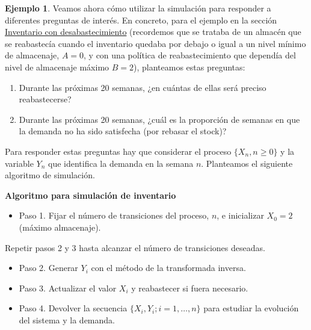 \documentclass[
]{book}
\providecommand{\tightlist}{%
  \setlength{\itemsep}{0pt}\setlength{\parskip}{0pt}}
\newenvironment{silverbox}{
  \definecolor{shadecolor}{rgb}{192, 192, 192}  
  \color{black}
  \begin{shaded}}
 {\end{shaded}}
\theoremstyle{definition}
\theoremstyle{definition}
\newtheorem{example}{Ejemplo}[chapter]
\theoremstyle{definition}
\theoremstyle{definition}
\theoremstyle{remark}
\begin{document}
\begin{example}

Veamos ahora cómo utilizar la simulación para responder a diferentes preguntas de interés. En concreto, para el ejemplo en la sección \protect\hyperlink{inventario2}{Inventario con desabastecimiento} (recordemos que se trataba de un almacén que se reabastecía cuando el inventario quedaba por debajo o igual a un nivel mínimo de almacenaje, \(A=0\), y con una política de reabastecimiento que dependía del nivel de almacenaje máximo \(B=2\)), planteamos estas preguntas:

\begin{enumerate}
\def\labelenumi{\arabic{enumi}.}
\item
  Durante las próximas 20 semanas, ¿en cuántas de ellas será preciso reabastecerse?
\item
  Durante las próximas 20 semanas, ¿cuál es la proporción de semanas en que la demanda no ha sido satisfecha (por rebasar el stock)?
\end{enumerate}

\end{example}

Para responder estas preguntas hay que considerar el proceso \(\{X_n, n \geq 0\}\) y la variable \(Y_n\) que identifica la demanda en la semana \(n\). Planteamos el siguiente algoritmo de simulación.

\begin{silverbox}

\textbf{Algoritmo para simulación de inventario}

\begin{itemize}
\tightlist
\item
  Paso 1. Fijar el número de transiciones del proceso, \(n\), e inicializar \(X_0 = 2\) (máximo almacenaje).
\end{itemize}

Repetir pasos 2 y 3 hasta alcanzar el número de transiciones deseadas.

\begin{itemize}
\item
  Paso 2. Generar \(Y_i\) con el método de la transformada inversa.
\item
  Paso 3. Actualizar el valor \(X_i\) y reabastecer si fuera necesario.
\item
  Paso 4. Devolver la secuencia \(\{X_i, Y_i; i=1,\ldots,n\}\) para estudiar la evolución del sistema y la demanda.
\end{itemize}

\end{silverbox}
\end{document}
